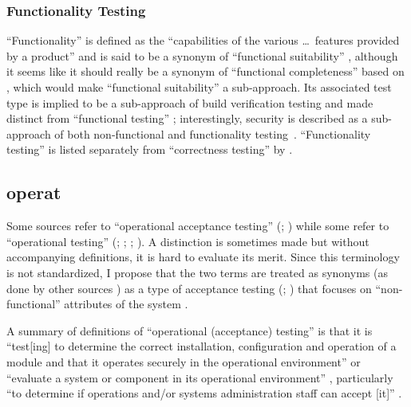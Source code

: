 \subsubsection{Functionality Testing}
``Functionality'' is defined as the
``capabilities of the various \dots\ features provided by a product''
\citep[p.~196]{IEEE2017} and is said to be a synonym of
``functional suitability'' \citepISTQB{}, although it seems
like it should really be a synonym of ``functional completeness'' based on
\citep{ISO_IEC2023a}, which would make ``functional suitability'' a
sub-approach. Its associated test type
is implied to be a sub-approach of build verification testing
\citepISTQB{} and made distinct from ``functional testing''%
\ifnotpaper; interestingly, security is described as a sub-approach of both
non-functional and functionality testing\fi\ \citep[Tab.~2]{Gerrard2000a}.
``Functionality testing'' is listed separately from ``correctness testing'' by
\citet[p.~53]{Firesmith2015}.

\ifnotpaper
    \subsection[Operational (Acceptance) Testing (OAT)]{\acf{operat}}
    \label{oat-discrep}
    Some sources refer to ``operational acceptance testing'' (\citealp[p.~22]{IEEE2022};
    \citealpISTQB{}) while some refer to ``operational testing''
    (\citealp[p.~6-9,~in the context of software engineering operations]{SWEBOK2024};
    \citealp{ISO_IEC2018}; \citealp[p.~303]{IEEE2017};
    \citealp[pp.~4-6,~4-9]{SWEBOK2014}). A distinction is sometimes made
    \citep[p.~30]{Firesmith2015} but without accompanying definitions, it is hard
    to evaluate its merit. Since this terminology is not standardized, I
    propose that the two terms are treated as synonyms (as done by other sources
    \citep{LambdaTest2024, BocchinoAndHamilton1996}) as a type of
    acceptance testing (\citealp[p.~22]{IEEE2022}; \citealpISTQB{}) that focuses on
    ``non-functional'' attributes of the system \citep{LambdaTest2024}%
    .

    A summary of definitions of ``operational (acceptance) testing'' is that
    it is ``test[ing] to determine the correct
    installation, configuration and operation of a module and that it operates
    securely in the operational environment'' \citep{ISO_IEC2018} or ``evaluate a
    system or component in its operational environment'' \citep[p.~303]{IEEE2017},
    particularly ``to determine if operations and/or systems administration staff
    can accept [it]'' \citepISTQB{}.
\fi


